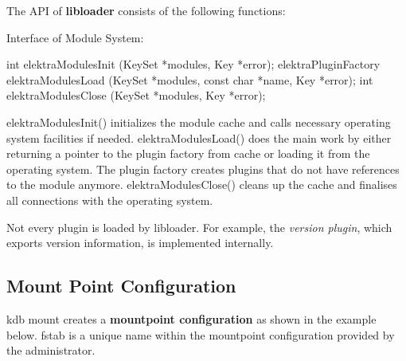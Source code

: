 The A\+PI of {\bfseries libloader} consists of the following functions\+:

Interface of Module System\+:


\begin{DoxyCode}
\textcolor{keywordtype}{int} elektraModulesInit (KeySet *modules, Key *error);
elektraPluginFactory elektraModulesLoad (KeySet *modules,
                \textcolor{keyword}{const} \textcolor{keywordtype}{char} *name, Key *error);
\textcolor{keywordtype}{int} elektraModulesClose (KeySet *modules, Key *error);
\end{DoxyCode}


{\ttfamily elektra\+Modules\+Init()} initializes the module cache and calls necessary operating system facilities if needed. {\ttfamily elektra\+Modules\+Load()} does the main work by either returning a pointer to the plugin factory from cache or loading it from the operating system. The plugin factory creates plugins that do not have references to the module anymore. {\ttfamily elektra\+Modules\+Close()} cleans up the cache and finalises all connections with the operating system.

Not every plugin is loaded by {\ttfamily libloader}. For example, the {\itshape version plugin}, which exports version information, is implemented internally.

\subsection*{Mount Point Configuration}

{\ttfamily kdb mount} creates a {\bfseries mountpoint configuration} as shown in the example below. {\ttfamily fstab} is a unique name within the mountpoint configuration provided by the administrator.

